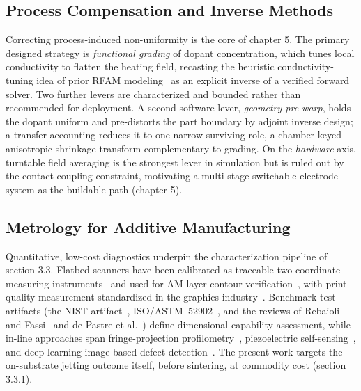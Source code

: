 \subsection{Process Compensation and Inverse Methods}
\label{sec:intro_bg_compensation}

Correcting process-induced non-uniformity is the core of chapter 5.
The primary designed strategy is \emph{functional grading} of dopant
concentration, which tunes local conductivity to flatten the heating field,
recasting the heuristic conductivity-tuning idea of prior RFAM
modeling~\cite{allison2022computational} as an explicit inverse of a verified
forward solver. Two further levers are characterized and
bounded rather than recommended for deployment. A second software lever, \emph{geometry pre-warp},
holds the dopant uniform and pre-distorts the part boundary by adjoint inverse
design; a transfer accounting reduces it to one narrow surviving role, a
chamber-keyed anisotropic shrinkage transform complementary to grading. On the
\emph{hardware} axis, turntable field averaging is the strongest lever in simulation
but is ruled out by the contact-coupling constraint, motivating a multi-stage
switchable-electrode system as the buildable path (chapter 5).

\subsection{Metrology for Additive Manufacturing}
\label{sec:intro_bg_metrology}

Quantitative, low-cost diagnostics underpin the characterization pipeline of
section 3.3. Flatbed scanners have been calibrated as traceable
two-coordinate measuring instruments~\cite{devicente2015scanner} and used for AM
layer-contour verification~\cite{blanco2020layercontour}, with print-quality
measurement standardized in the graphics industry~\cite{ISO24790}. Benchmark
test artifacts (the NIST artifact~\cite{moylan2014testartifact},
ISO/ASTM~52902~\cite{ISOASTM52902}, and the reviews of Rebaioli and
Fassi~\cite{rebaioli2017benchmark} and de Pastre et
al.~\cite{depastre2020testartefacts}) define dimensional-capability assessment,
while in-line approaches span fringe-projection
profilometry~\cite{zhang2016fringeprofilometry}, piezoelectric
self-sensing~\cite{wang2020piezoselfsensing}, and deep-learning image-based defect
detection~\cite{li2024deeplearningAM,kim2023imagefaultsurvey}. The present work
targets the on-substrate jetting outcome itself, before sintering, at commodity
cost (section 3.3.1).

